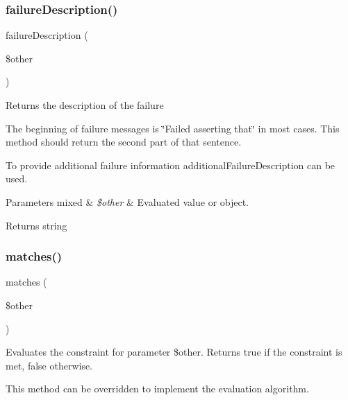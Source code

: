 \subsubsection{\texorpdfstring{failure\+Description()}{failureDescription()}}
{\footnotesize\ttfamily failure\+Description (\begin{DoxyParamCaption}\item[{}]{\$other }\end{DoxyParamCaption})\hspace{0.3cm}{\ttfamily [protected]}}

Returns the description of the failure

The beginning of failure messages is \char`\"{}\+Failed asserting that\char`\"{} in most cases. This method should return the second part of that sentence.

To provide additional failure information additional\+Failure\+Description can be used.


\begin{DoxyParams}[1]{Parameters}
mixed & {\em \$other} & Evaluated value or object.\\
\hline
\end{DoxyParams}
\begin{DoxyReturn}{Returns}
string 
\end{DoxyReturn}
\mbox{\label{class_p_h_p_unit___framework___constraint_a9c9c337de483bbdbb9fa249a6c7c9cc5}} 
\subsubsection{\texorpdfstring{matches()}{matches()}}
{\footnotesize\ttfamily matches (\begin{DoxyParamCaption}\item[{}]{\$other }\end{DoxyParamCaption})\hspace{0.3cm}{\ttfamily [protected]}}

Evaluates the constraint for parameter \$other. Returns true if the constraint is met, false otherwise.

This method can be overridden to implement the evaluation algorithm.


